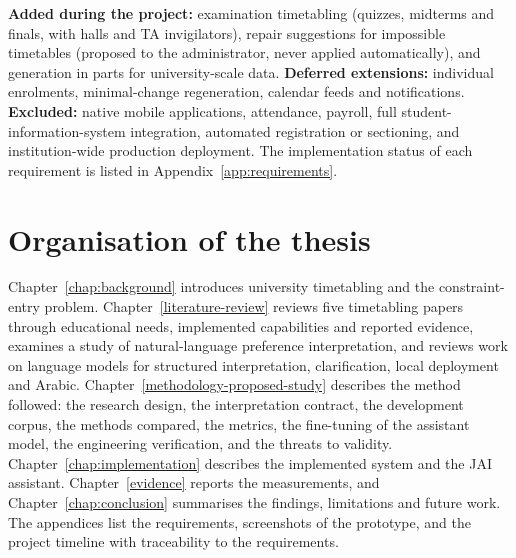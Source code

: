 \textbf{Added during the project:} examination timetabling (quizzes, midterms and finals, with halls and TA invigilators), repair suggestions for impossible timetables (proposed to the administrator, never applied automatically), and generation in parts for university-scale data. \textbf{Deferred extensions:} individual enrolments, minimal-change regeneration, calendar feeds and notifications. \textbf{Excluded:} native mobile applications, attendance, payroll, full student-information-system integration, automated registration or sectioning, and institution-wide production deployment. The implementation status of each requirement is listed in Appendix~\ref{app:requirements}.

\hypertarget{organisation-of-the-thesis}{%
\section{Organisation of the thesis}\label{organisation-of-the-thesis}}

Chapter~\ref{chap:background} introduces university timetabling and the constraint-entry problem. Chapter~\ref{literature-review} reviews five timetabling papers through educational needs, implemented capabilities and reported evidence, examines a study of natural-language preference interpretation, and reviews work on language models for structured interpretation, clarification, local deployment and Arabic. Chapter~\ref{methodology-proposed-study} describes the method followed: the research design, the interpretation contract, the development corpus, the methods compared, the metrics, the fine-tuning of the assistant model, the engineering verification, and the threats to validity. Chapter~\ref{chap:implementation} describes the implemented system and the JAI assistant. Chapter~\ref{evidence} reports the measurements, and Chapter~\ref{chap:conclusion} summarises the findings, limitations and future work. The appendices list the requirements, screenshots of the prototype, and the project timeline with traceability to the requirements.
